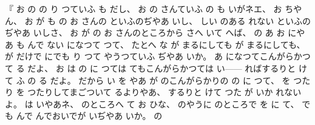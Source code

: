 『
お
の
の
り
つていふ
も
だし、%
%
お
の
さんていふ
の
も
いがネエ、
%
お
ちやん、
%
お
が
も
の
お
さんの
といふのぢやあ
いし、
%
しい
のある
れない
といふのぢやあ
いしさ、
%
お
が
の
お
さんのところから
さへ
いて
へば、
%
の
あ
お
にやあ
も
んで
ない
になつて
つて、
%
たとへ
な
が
まるにしても
が
まるにしても、
%
が
だけで
にでも
り
つて
やうつていふ
ぢやあ
いか。
%
あ
になつてこんがらかつて
る
だよ、
%
お
は
の
に
つては
てもこんがらかつては
い{---}{---}
ればするりと
けて
ふ
の
る
だよ。
%
だから
い
を
やあ
が
のこんがらかりの
の
に
つて、
%
を
つたり
を
つたりしてまごついて
るよりやあ、
%
するりと
けて
つた
が
いか
れないよ。
%
は
いやあネ、
%
のところへ
て
お
ひな、
%
のやうに
のところで
を
に
て、
%
でも
んで
んでおいでが
いぢやあ
いか。
%
の
